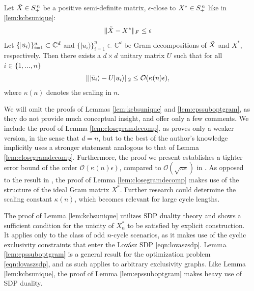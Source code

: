\begin{lemma}
\label{lem:closegramdecomp}
Let $\Tilde{X}\in S_{+}^{\thinspace n}$ be a positive semi-definite matrix, $\epsilon$-close to $X^*\in S_{+}^{\thinspace n}$ like in \ref{lem:kcbsunique}:
\begin{equation*}
\|\Tilde{X}-X^*\|_F \leq \epsilon
\end{equation*}
Let $\{\vert \Tilde{u}_i \rangle\}_{i=1}^n\subset\mathbb{C}^{d}$ and $\{\vert u_i\rangle\}_{i=1}^n\subset\mathbb{C}^{d}$ be Gram decompositions of $\Tilde{X}$ and $X^*$, respectively. Then there exists a $d\times d$ unitary matrix $U$ such that for all $i\in\{1,\dots,n\}$
\begin{equation*}
    \|\vert \Tilde{u}_i\rangle - U \vert u_i\rangle\|_2 \leq \mathcal{O}(\kappa(n)\epsilon),
\end{equation*}
where $\kappa(n)$ denotes the scaling in $n$.
\end{lemma}

We will omit the proofs of Lemmas \ref{lem:kcbsunique} and \ref{lem:epssuboptgram}, as they do not provide much conceptual insight, and offer only a few comments. We include the proof of Lemma \ref{lem:closegramdecomp}, as \cite{Bharti2019} proves only a weaker version, in the sense that $d=n$, but to the best of the author's knowledge implicitly uses a stronger statement analogous to that of Lemma \ref{lem:closegramdecomp}. Furthermore, the proof we present establishes a tighter error bound of the order $\mathcal{O}(\kappa(n)\epsilon)$, compared to $\mathcal{O}(\sqrt{n\epsilon})$ in \cite{Bharti2019}. As opposed to the result in \cite{Bharti2019}, the proof of Lemma \ref{lem:closegramdecomp} makes use of the structure of the ideal Gram matrix $X^*$. Further research could determine the scaling constant $\kappa(n)$, which becomes relevant for large cycle lengths.

The proof of Lemma \ref{lem:kcbsunique} utilizes SDP duality theory and shows a sufficient condition for the unicity of $X^*_n$ to be satisfied by explicit construction. It applies only to the class of odd $n$-cycle scenarios, as it makes use of the cyclic exclusivity constraints that enter the Lovász SDP \ref{eqn:lovaszsdp}. Lemma \ref{lem:epssuboptgram} is a general result for the optimization problem \ref{eqn:lovaszsdp}, and as such applies to arbitrary exclusivity graphs. Like Lemma \ref{lem:kcbsunique}, the proof of Lemma \ref{lem:epssuboptgram} makes heavy use of SDP duality. 

